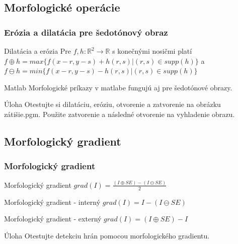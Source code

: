 \documentclass{beamer}
\begin{document}
\subsection{Morfologické operácie}

\begin{frame}
\frametitle{Erózia a dilatácia pre šedotónový obraz} 

  \begin{block}{Dilatácia a erózia}
  Pre $f, h \colon \mathbb{R}^2 \to \mathbb{R}$ s konečnými nosičmi platí $f \oplus h = max\{ f(x-r, y-s) + h (r,s) | (r,s) \in supp(h)\}$ a \\
  $f \ominus h = min\{ f(x-r, y-s) - h (r,s) | (r,s) \in supp(h)\}$
  \end{block}   

  \begin{block}{Matlab}
  Morfologické príkazy v matlabe fungujú aj pre šedotónové obrazy.
  \end{block}
  
  \begin{block}{Úloha}
  Otestujte si dilatáciu, eróziu, otvorenie a zatvorenie na obrázku zátišie.pgm. Použite zatvorenie a následné otvorenie na vyhladenie obrazu.
  \end{block}   
\end{frame}


\subsection{Morfologický gradient}

\begin{frame}
\frametitle{Morfologický gradient} 

  \begin{block}{Morfologický gradient}
  $grad(I) = \frac{(I \oplus SE) - (I \ominus SE)}{2}$
  \end{block}   

  \begin{block}{Morfologický gradient - interný}
  $grad(I) = I - (I \ominus SE)$
  \end{block}     
  
  \begin{block}{Morfologický gradient - externý}
  $grad(I) = (I \oplus SE) - I$
  \end{block}     
  
  \begin{block}{Úloha}
  Otestujte detekciu hrán pomocou morfologického gradientu.
  \end{block}   
\end{frame}
\end{document}
